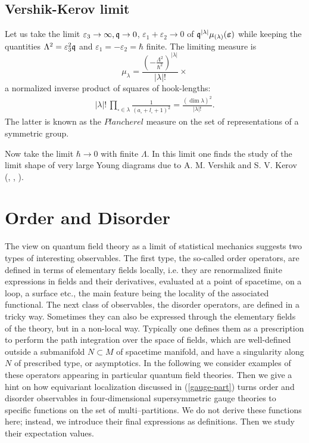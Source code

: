 \documentclass[12pt]{article}
\numberwithin{equation}{section}
\newcommand{\ve}{{\varepsilon}}
\newcommand{\bve}{\boldsymbol{\varepsilon}}
\newcommand\beq{\begin{equation}}
\newcommand\eeq{\end{equation}}
\theoremstyle{definition}
\begin{document}
\subsection{Vershik-Kerov limit}
Let us take the limit
$\varepsilon_3 \rightarrow \infty , \frak{q} \to 0$, ${\ve}_{1} + {\ve}_{2} \to 0$ of $\frak{q}^{|\lambda|}\mu_{(\lambda)}(\bve)$ while keeping the quantities $\Lambda^2 = {\ve}_3^{2} \frak{q}$
and $\varepsilon_{1} = -\varepsilon_2 = {\hbar}$ finite. The limiting measure is
\beq
\mu_{\lambda} = \frac{\left( - \frac{\Lambda^2}{\hbar^2} \right)^{|{\lambda}|}}{|\lambda|!} \times
\eeq
a normalized inverse product of squares of hook-lengths: 
\begin{align*}
    |\lambda|! \,  \prod\limits_{\square \in \lambda}  \frac{1}{(a_{\square} + l_{\square} + 1)^2} = \frac{(\dim \lambda)^2}{|\lambda|!}.
\end{align*}
The latter is known  as the $\textit{Plancherel}$ measure on the set of representations of a symmetric group.

Now take the limit $\hbar \rightarrow 0$ with finite $\Lambda$. In this limit one finds the study of the limit shape of very large Young diagrams due to A. M. Vershik and S. V. Kerov (\cite{Logan1977AVP}, \cite{VerKer77}, \cite{VerKer85}).

\section{Order and Disorder}

The view on quantum field theory as a limit of statistical mechanics suggests two types of interesting observables. The first type, the so-called order operators, are defined in terms of elementary fields locally, i.e. they are renormalized finite expressions in fields and their derivatives, evaluated at a point of spacetime, on a loop, a surface etc., the main feature being the locality of the associated functional. 
The next class of observables, the disorder operators, are defined in a tricky way. Sometimes they can also be expressed through the elementary fields of the theory, but in a non-local way.  Typically one defines them as a prescription to perform the path integration over the space of fields, which are well-defined outside a submanifold $N \subset M$ of spacetime manifold, 
and have a singularity along $N$ of prescribed type, or asymptotics. In the following we consider examples of these operators appearing in particular quantum field theories. Then we give a hint on how equivariant localization discussed in (\ref{gauge-part}) turns order and disorder observables in four-dimensional supersymmetric gauge theories to specific functions on the set of multi--partitions. 
We do not derive these functions here; instead, we introduce their final expressions as definitions. Then we study their expectation values.
\iffalse
\end{document}
